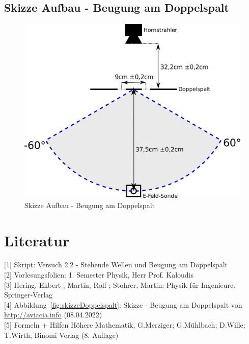 \documentclass[a4paper]{scrartcl}
\numberwithin{equation}{subsection}
\begin{document}
\subsection{Skizze Aufbau - Beugung am Doppelspalt}

\label{sec:SkizzeDoppelspalt}

\begin{figure}[H]
\includegraphics[width=12cm]{Zeichnung_Doppelspalt}
\centering
\caption{Skizze Aufbau - Beugung am Doppelspalt}
\centering
\label{fig:SkizzeDoppelspalt}
\end{figure}

\newpage
\section{Literatur}
$[$1$]$ Skript: Versuch 2.2 - Stehende Wellen und Beugung am Doppelspalt \\
$[$2$]$ Vorlesungsfolien: 1. Semester Physik, Herr Prof. Kaloudis \\
$[$3$]$ Hering, Ekbert ; Martin, Rolf ; Stohrer, Martin: Physik für Ingenieure. Springer-Verlag \\
$[$4$]$ Abbildung~\ref{fig:skizzeDoppelspalt}: Skizze - Beugung am Doppelspalt von \href{http://aviacia.info/p/beugung-am-gitter-4265}{http://aviacia.info} (08.04.2022)\\
$[$5$]$ Formeln + Hilfen Höhere Mathematik, G.Merziger; G.Mühlbach; D.Wille; T.Wirth, Binomi Verlag (8. Auflage)


\label{LastPage}
\end{document}
